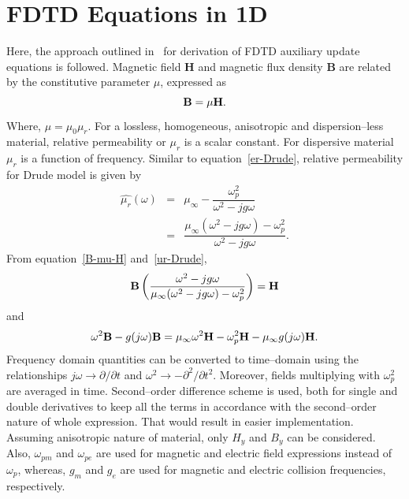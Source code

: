 \section{FDTD Equations in 1D}
Here, the approach outlined in~\cite{Radial-Zhao} for derivation of FDTD auxiliary update equations is followed. Magnetic field $\textbf{H}$ and magnetic flux density $\textbf{B}$ are related by the constitutive parameter $\mu$, expressed as
\begin{equation}
\centering
\textbf{B} = \mu \textbf{H}.
\label{B-mu-H}
\end{equation}
Where, $\mu = \mu_0 \mu_r$. For a lossless, homogeneous, anisotropic and dispersion--less material, relative permeability or $\mu_r$ is a scalar constant. For dispersive material $\mu_r$ is a function of frequency. Similar to equation~\ref{er-Drude}, relative permeability for Drude model is given by
\begin{eqnarray}
\nonumber \hat{\mu_r}(\omega)&=&\mu_\infty-\dfrac{\omega^2_p}{\omega^2-jg\omega}\\
&=&\dfrac{\mu_\infty(\omega^2-jg\omega)-\omega^2_p}{\omega^2-jg\omega}.
\label{ur-Drude}
\end{eqnarray}
From equation~\ref{B-mu-H} and~\ref{ur-Drude},
\begin{equation}
\centering
\nonumber \textbf{B} \left( \dfrac{\omega^2-jg\omega}{\mu_\infty(\omega^2-jg\omega)-\omega^2_p} \right) =\textbf{H}
\label{B-muomega-H}
\end{equation}
and
\begin{equation}
\centering
\omega^2\textbf{B}-g(j\omega)\textbf{B} = \mu_\infty\omega^2\textbf{H}-\omega^2_p\textbf{H}-\mu_\infty g(j\omega)\textbf{H}.
\label{B-muomega-H-frequency-domain}
\end{equation}
Frequency domain quantities can be converted to time--domain using the relationships $j\omega \rightarrow \partial/\partial t$ and $\omega^2 \rightarrow - \partial^2/\partial t^2$. Moreover, fields multiplying with $\omega^2_p$ are averaged in time. Second--order difference scheme is used, both for single and double derivatives to keep all the terms in accordance with the second--order nature of whole expression. That would result in easier implementation. Assuming anisotropic nature of material, only $H_y$ and $B_y$ can be considered. Also, $\omega_{pm}$ and $\omega_{pe}$ are used for magnetic and electric field expressions instead of $\omega_p$, whereas, $g_m$ and $g_e$ are used for magnetic and electric collision frequencies, respectively.

